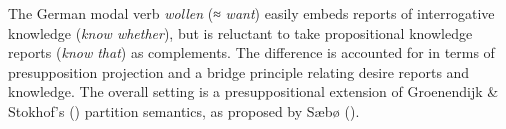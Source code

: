 The German modal verb \textit{wollen} (≈ \textit{want}) easily embeds reports of interrogative knowledge (\textit{know whether}), but is reluctant to take propositional knowledge reports (\textit{know that}) as complements. The difference is accounted for in terms of presupposition projection and a bridge principle relating desire reports and knowledge. The overall setting is a presuppositional extension of Groenendijk \& Stokhof’s (\cite*{groenendijk-stokhof1982-lingphil,groenendijk-stokhof1984-thesis}) partition semantics, as proposed by Sæbø (\cite*{saebo2007-tbillc}).
\endinput